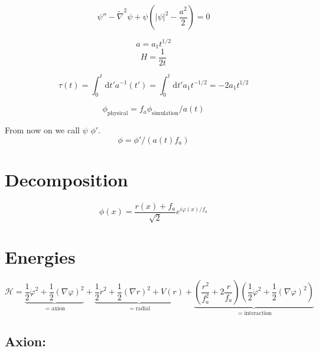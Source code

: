 \documentclass[a4paper]{article}
\begin{document}
\begin{equation}
    \psi'' - \tilde{\nabla}^2 \psi + \psi ( |\psi|^2 - \frac{a^2}{2} ) = 0
\end{equation}

\begin{equation}
    a = a_1 t^{1/2}
\end{equation}
\begin{equation}
    H = \frac{1}{2t}
\end{equation}

\begin{equation}
    \tau(t) = \int_0^t \mathrm{d} t' a^{-1}(t') = \int_0^t \mathrm{d} t' a_1 t^{-1/2} = -2 a_1 t^{1/2}
\end{equation}

\begin{equation}
    \phi_\mathrm{physical} = f_a \phi_\mathrm{simulation} / a(t)
\end{equation}

From now on we call $\psi$ $\phi'$.
\begin{equation}
    \phi= \phi' / (a(t) f_a)
\end{equation}

\section{Decomposition}
\begin{equation}
    \phi(x) = \frac{r(x) + f_a}{\sqrt{2}} e^{i \varphi(x) / f_a }
\end{equation}

\section{Energies}

\begin{equation}
    \mathcal{H} =
    \underbrace{\frac{1}{2} \dot{\varphi}^2 + \frac{1}{2} (\nabla \varphi)^2}_{= \mathrm{axion}} +
    \underbrace{\frac{1}{2} \dot{r}^2 + \frac{1}{2} (\nabla r)^2 + V(r)}_{= \mathrm{radial}} +
    \underbrace{\left( \frac{r^2}{f_a^2} + 2 \frac{r}{f_a} \right) \left( \frac{1}{2} \dot{\varphi}^2 + \frac{1}{2} (\nabla \varphi)^2 \right)}_{= \mathrm{interaction}}
\end{equation}

\subsection{Axion:}
\end{document}
